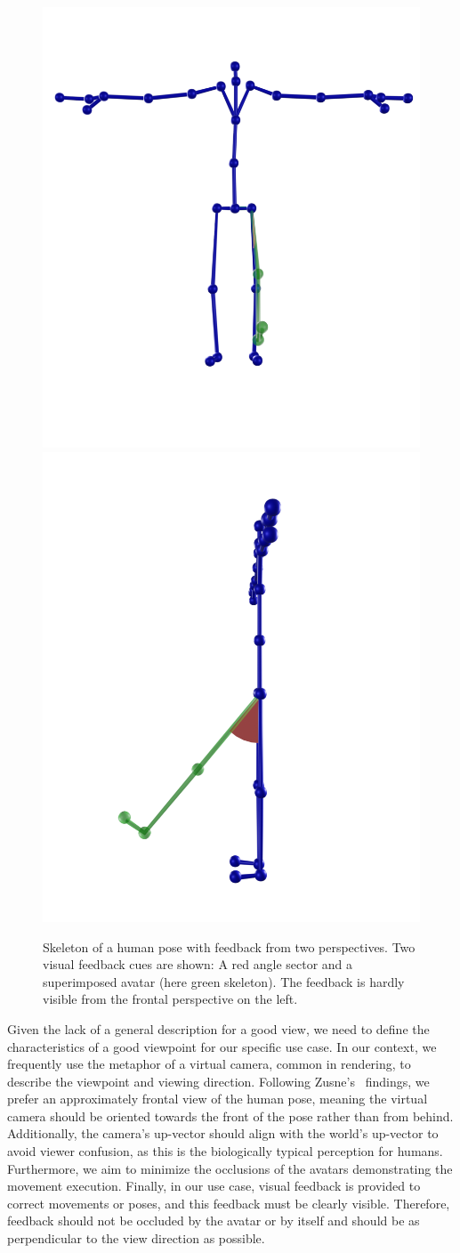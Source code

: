 \begin{figure}[t!h]
	\centering
	\includegraphics[width=0.49\linewidth]{pictures/feedbackFront.png}
	\includegraphics[width=0.49\linewidth]{pictures/feedbackSide.png}
	\caption[Skeleton of a human pose with feedback from two perspectives.]{Skeleton of a human pose with feedback from two perspectives. Two visual feedback cues are shown: A red angle sector and a superimposed avatar (here green skeleton). The feedback is hardly visible from the frontal perspective on the left.}
	\label{fig:skeletonFeedbackPerspective}
\end{figure}

Given the lack of a general description for a good view, we need to define the characteristics of a good viewpoint for our specific use case. In our context, we frequently use the metaphor of a virtual camera, common in rendering, to describe the viewpoint and viewing direction. Following Zusne's~\cite{zusne1970vpf} findings, we prefer an approximately frontal view of the human pose, meaning the virtual camera should be oriented towards the front of the pose rather than from behind. Additionally, the camera's up-vector should align with the world's up-vector to avoid viewer confusion, as this is the biologically typical perception for humans. Furthermore, we aim to minimize the occlusions of the avatars demonstrating the movement execution. Finally, in our use case, visual feedback is provided to correct movements or poses, and this feedback must be clearly visible. Therefore, feedback should not be occluded by the avatar or by itself and should be as perpendicular to the view direction as possible.

